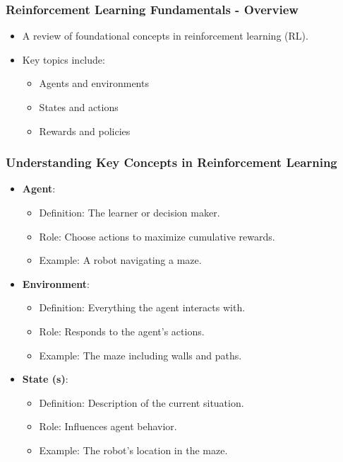 \documentclass[aspectratio=169]{beamer}
\begin{document}
\begin{frame}[fragile]
    \frametitle{Reinforcement Learning Fundamentals - Overview}
    \begin{itemize}
        \item A review of foundational concepts in reinforcement learning (RL).
        \item Key topics include:
        \begin{itemize}
            \item Agents and environments
            \item States and actions
            \item Rewards and policies
        \end{itemize}
    \end{itemize}
\end{frame}

\begin{frame}[fragile]
    \frametitle{Understanding Key Concepts in Reinforcement Learning}
    \begin{itemize}
        \item \textbf{Agent}:
            \begin{itemize}
                \item Definition: The learner or decision maker.
                \item Role: Choose actions to maximize cumulative rewards.
                \item Example: A robot navigating a maze.
            \end{itemize}

        \item \textbf{Environment}:
            \begin{itemize}
                \item Definition: Everything the agent interacts with.
                \item Role: Responds to the agent's actions.
                \item Example: The maze including walls and paths.
            \end{itemize}
        
        \item \textbf{State (s)}:
            \begin{itemize}
                \item Definition: Description of the current situation.
                \item Role: Influences agent behavior.
                \item Example: The robot's location in the maze.
            \end{itemize}
    \end{itemize}
\end{frame}
\end{document}
